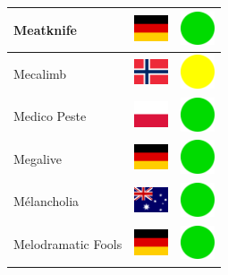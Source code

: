 \documentclass[12pt, a4paper, twoside]{report}
\begin{document}
\begin{center}
\begin{longtable}{|p{5cm}|p{2cm}|p{2cm}|}
 Meatknife                                                  & \includegraphics[width=1cm]{../4x3/de} &   \includegraphics[width=1cm]{../likes/y} \\ \hline
 Mecalimb                                                   & \includegraphics[width=1cm]{../4x3/no} &   \includegraphics[width=1cm]{../likes/m} \\ \hline
 Medico Peste                                               & \includegraphics[width=1cm]{../4x3/pl} &   \includegraphics[width=1cm]{../likes/y} \\ \hline
 Megalive                                                   & \includegraphics[width=1cm]{../4x3/de} &   \includegraphics[width=1cm]{../likes/y} \\ \hline
 Mélancholia                                                & \includegraphics[width=1cm]{../4x3/au} &   \includegraphics[width=1cm]{../likes/y} \\ \hline
 Melodramatic Fools                                         & \includegraphics[width=1cm]{../4x3/de} &   \includegraphics[width=1cm]{../likes/y} \\ \hline

\end{longtable}
\end{center}
\end{document}
